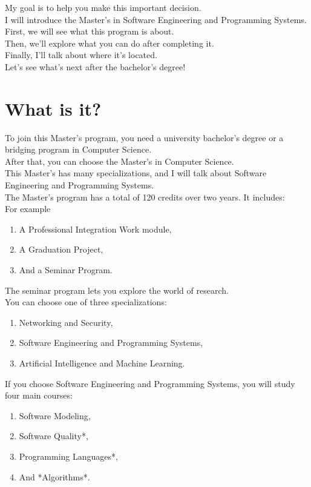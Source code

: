 \documentclass{article}
\begin{document}
My goal is to help you make this important decision.\\

I will introduce the Master’s in Software Engineering and Programming Systems.\\  
First, we will see what this program is about.  \\

Then, we’ll explore what you can do after completing it.\\  
Finally, I’ll talk about where it’s located.\\

Let’s see what’s next after the bachelor’s degree!

\section{What is it?}

To join this Master’s program, you need a university bachelor’s degree or 
a bridging program in Computer Science. \\
After that, you can choose the Master’s in Computer Science.\\ 
This Master’s has many specializations, and I will talk about Software Engineering and Programming Systems.\\

The Master’s program has a total of 120 credits over two years. It includes:  \\
For example

\begin{enumerate} 
   \item A Professional Integration Work module,  
   \item A Graduation Project,  
    \item And a Seminar Program.  
\end{enumerate}
The seminar program lets you explore the world of research. \\

You can choose one of three specializations:  \\
\begin{enumerate} 
   \item Networking and Security,  
    \item Software Engineering and Programming Systems,  
   \item Artificial Intelligence and Machine Learning.  
\end{enumerate}

If you choose Software Engineering and Programming Systems, you will study four main courses: \\ 
\begin{enumerate} 
  \item Software Modeling,  
   \item Software Quality*,  
   \item Programming Languages*,  
    \item And *Algorithms*.  
\end{enumerate}
\end{document}
